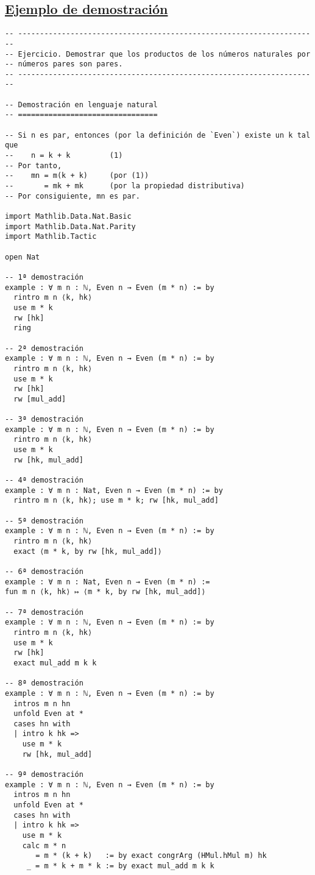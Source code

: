 \subsection{\href{./src/Introduccion/Ejemplo\_de\_demostracion.lean}{Ejemplo de demostración}}
\label{sec:orgf53b29f}
\begin{verbatim}
-- ---------------------------------------------------------------------
-- Ejercicio. Demostrar que los productos de los números naturales por
-- números pares son pares.
-- ---------------------------------------------------------------------

-- Demostración en lenguaje natural
-- ================================

-- Si n es par, entonces (por la definición de `Even`) existe un k tal que
--    n = k + k         (1)
-- Por tanto,
--    mn = m(k + k)     (por (1))
--       = mk + mk      (por la propiedad distributiva)
-- Por consiguiente, mn es par.

import Mathlib.Data.Nat.Basic
import Mathlib.Data.Nat.Parity
import Mathlib.Tactic

open Nat

-- 1ª demostración
example : ∀ m n : ℕ, Even n → Even (m * n) := by
  rintro m n ⟨k, hk⟩
  use m * k
  rw [hk]
  ring

-- 2ª demostración
example : ∀ m n : ℕ, Even n → Even (m * n) := by
  rintro m n ⟨k, hk⟩
  use m * k
  rw [hk]
  rw [mul_add]

-- 3ª demostración
example : ∀ m n : ℕ, Even n → Even (m * n) := by
  rintro m n ⟨k, hk⟩
  use m * k
  rw [hk, mul_add]

-- 4ª demostración
example : ∀ m n : Nat, Even n → Even (m * n) := by
  rintro m n ⟨k, hk⟩; use m * k; rw [hk, mul_add]

-- 5ª demostración
example : ∀ m n : ℕ, Even n → Even (m * n) := by
  rintro m n ⟨k, hk⟩
  exact ⟨m * k, by rw [hk, mul_add]⟩

-- 6ª demostración
example : ∀ m n : Nat, Even n → Even (m * n) :=
fun m n ⟨k, hk⟩ ↦ ⟨m * k, by rw [hk, mul_add]⟩

-- 7ª demostración
example : ∀ m n : ℕ, Even n → Even (m * n) := by
  rintro m n ⟨k, hk⟩
  use m * k
  rw [hk]
  exact mul_add m k k

-- 8ª demostración
example : ∀ m n : ℕ, Even n → Even (m * n) := by
  intros m n hn
  unfold Even at *
  cases hn with
  | intro k hk =>
    use m * k
    rw [hk, mul_add]

-- 9ª demostración
example : ∀ m n : ℕ, Even n → Even (m * n) := by
  intros m n hn
  unfold Even at *
  cases hn with
  | intro k hk =>
    use m * k
    calc m * n
       = m * (k + k)   := by exact congrArg (HMul.hMul m) hk
     _ = m * k + m * k := by exact mul_add m k k


\end{verbatim}
